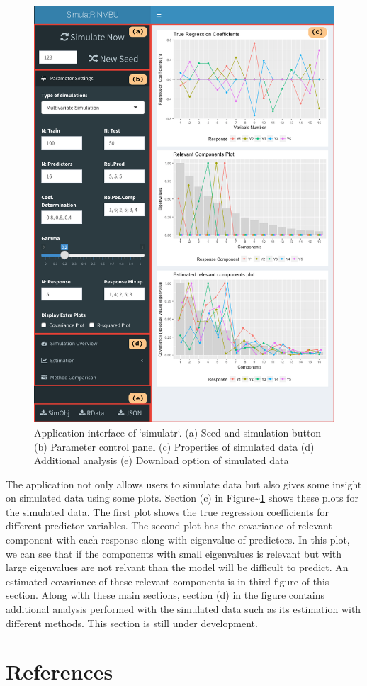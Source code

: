 \documentclass[12pt,A4paper,authoryear]{elsarticle} %
\theoremstyle{definition}
\theoremstyle{definition}
\theoremstyle{remark}
\begin{document}
\begin{figure}[!hbt]

{\centering \includegraphics[width=0.95\linewidth]{images/screenshots/AppSimulatr} 

}

\caption{Application interface of `simulatr`. (a) Seed and simulation button (b) Parameter control panel (c) Properties of simulated data (d) Additional analysis (e) Download option of simulated data}\label{fig:AppSimulatr}
\end{figure}

The application not only allows users to simulate data but also gives
some insight on simulated data using some plots. Section (c) in
Figure\textasciitilde{}\ref{fig:AppSimulatr} shows these plots for the
simulated data. The first plot shows the true regression coefficients
for different predictor variables. The second plot has the covariance of
relevant component with each response along with eigenvalue of
predictors. In this plot, we can see that if the components with small
eigenvalues is relevant but with large eigenvalues are not relvant than
the model will be difficult to predict. An estimated covariance of these
relevant components is in third figure of this section. Along with these
main sections, section (d) in the figure contains additional analysis
performed with the simulated data such as its estimation with different
methods. This section is still under development.

\section*{References}\label{references}


\renewcommand\refname{References}

\end{document}
